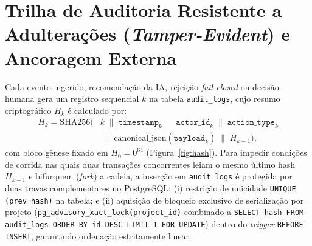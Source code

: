 \documentclass[12pt,openany,oneside,a4paper,english,brazilian,sumario=tradicional]{abntex2}
\begin{document}
\section{Trilha de Auditoria Resistente a Adulterações (\textit{Tamper-Evident}) e Ancoragem Externa}\label{sec:auditoria}

Cada evento ingerido, recomendação da IA, rejeição \textit{fail-closed} ou decisão humana gera um registro sequencial $k$ na tabela \texttt{audit\_logs}, cujo resumo criptográfico $H_k$ é calculado por:
\begin{equation}
\begin{aligned}
H_k = \mathrm{SHA256}\big(&k \;\|\; \texttt{timestamp}_k \;\|\; \texttt{actor\_id}_k \;\|\; \texttt{action\_type}_k \\
&\;\|\; \mathrm{canonical\_json}(\texttt{payload}_k) \;\|\; H_{k-1}\big),
\end{aligned}
\end{equation}
com bloco gênese fixado em $H_0 = 0^{64}$ (Figura~\ref{fig:hash}). Para impedir condições de corrida nas quais duas transações concorrentes leiam o mesmo último hash $H_{k-1}$ e bifurquem (\textit{fork}) a cadeia, a inserção em \texttt{audit\_logs} é protegida por duas travas complementares no PostgreSQL: (i) restrição de unicidade \texttt{UNIQUE (prev\_hash)} na tabela; e (ii) aquisição de bloqueio exclusivo de serialização por projeto (\texttt{pg\_advisory\_xact\_lock(project\_id)} combinado a \texttt{SELECT hash FROM audit\_logs ORDER BY id DESC LIMIT 1 FOR UPDATE}) dentro do \textit{trigger} \texttt{BEFORE INSERT}, garantindo ordenação estritamente linear.
\end{document}
